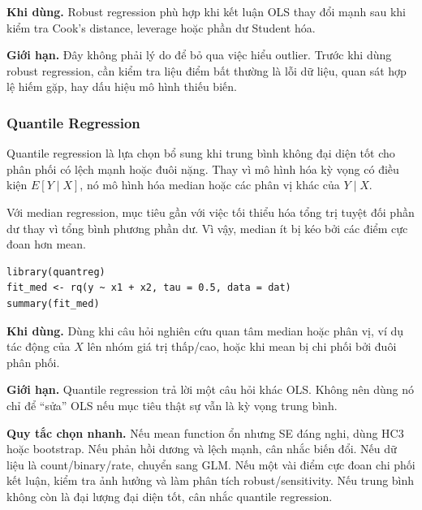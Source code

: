 \textbf{Khi dùng.} Robust regression phù hợp khi kết luận OLS thay đổi mạnh sau khi kiểm tra Cook's distance, leverage hoặc phần dư Student hóa.

\textbf{Giới hạn.} Đây không phải lý do để bỏ qua việc hiểu outlier. Trước khi dùng robust regression, cần kiểm tra liệu điểm bất thường là lỗi dữ liệu, quan sát hợp lệ hiếm gặp, hay dấu hiệu mô hình thiếu biến.

\subsubsection{Quantile Regression}

Quantile regression là lựa chọn bổ sung khi trung bình không đại diện tốt cho phân phối có lệch mạnh hoặc đuôi nặng. Thay vì mô hình hóa kỳ vọng có điều kiện $E[Y\mid X]$, nó mô hình hóa median hoặc các phân vị khác của $Y\mid X$.

Với median regression, mục tiêu gần với việc tối thiểu hóa tổng trị tuyệt đối phần dư thay vì tổng bình phương phần dư. Vì vậy, median ít bị kéo bởi các điểm cực đoan hơn mean.

\begin{lstlisting}[style=Rstyle]
library(quantreg)
fit_med <- rq(y ~ x1 + x2, tau = 0.5, data = dat)
summary(fit_med)
\end{lstlisting}

\textbf{Khi dùng.} Dùng khi câu hỏi nghiên cứu quan tâm median hoặc phân vị, ví dụ tác động của $X$ lên nhóm giá trị thấp/cao, hoặc khi mean bị chi phối bởi đuôi phân phối.

\textbf{Giới hạn.} Quantile regression trả lời một câu hỏi khác OLS. Không nên dùng nó chỉ để ``sửa'' OLS nếu mục tiêu thật sự vẫn là kỳ vọng trung bình.

\begin{notebox}
\textbf{Quy tắc chọn nhanh.} Nếu mean function ổn nhưng SE đáng nghi, dùng HC3 hoặc bootstrap. Nếu phản hồi dương và lệch mạnh, cân nhắc biến đổi. Nếu dữ liệu là count/binary/rate, chuyển sang GLM. Nếu một vài điểm cực đoan chi phối kết luận, kiểm tra ảnh hưởng và làm phân tích robust/sensitivity. Nếu trung bình không còn là đại lượng đại diện tốt, cân nhắc quantile regression.
\end{notebox}

